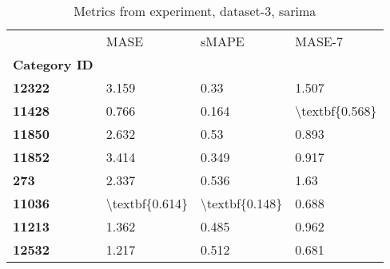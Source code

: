 \begin{table}[h]
\centering
\caption{Metrics from experiment, dataset-3, sarima}
\label{table:sarima-dataset-3}
\begin{tabular}{llll}
\toprule
{} &            MASE &           sMAPE &          MASE-7 \\
\textbf{Category ID} &                 &                 &                 \\
\midrule
\textbf{12322      } &           3.159 &            0.33 &           1.507 \\
\textbf{11428      } &           0.766 &           0.164 &  \textbackslash textbf\{0.568\} \\
\textbf{11850      } &           2.632 &            0.53 &           0.893 \\
\textbf{11852      } &           3.414 &           0.349 &           0.917 \\
\textbf{273        } &           2.337 &           0.536 &            1.63 \\
\textbf{11036      } &  \textbackslash textbf\{0.614\} &  \textbackslash textbf\{0.148\} &           0.688 \\
\textbf{11213      } &           1.362 &           0.485 &           0.962 \\
\textbf{12532      } &           1.217 &           0.512 &           0.681 \\
\bottomrule
\end{tabular}
\end{table}
